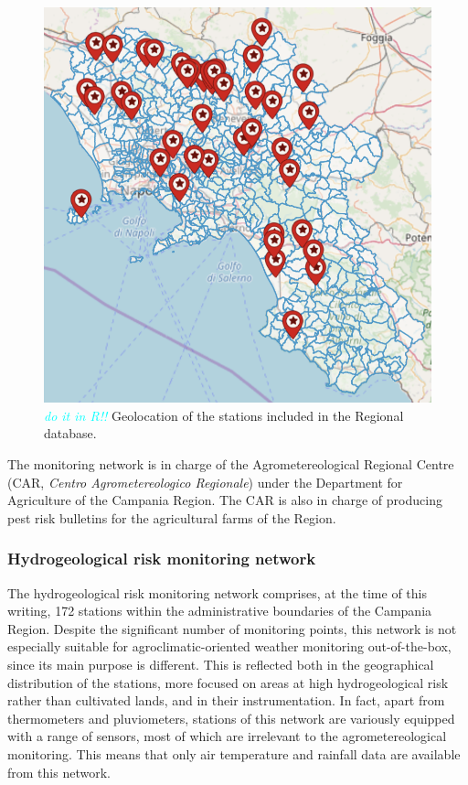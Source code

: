 \documentclass[authoryear,preprint,review,12pt]{elsarticle}
\newcommand{\review}[1]{\emph{\textcolor{cyan}{#1}}}
\begin{document}
\begin{figure}
	\centering
	\includegraphics[scale=.8]{figures/rarLocations}
	\caption{ \review{do it in R!!} Geolocation of the stations included in the Regional database. }
	\label{fig:rarLocations}
\end{figure}

The monitoring network is in charge of the Agrometereological Regional Centre (CAR, \emph{Centro Agrometereologico Regionale}) under the Department for Agriculture of the Campania Region. The CAR is also in charge of producing pest risk bulletins for the agricultural farms of the Region.

\subsubsection{Hydrogeological risk monitoring network\label{DPCNetwork}}
The hydrogeological risk monitoring network comprises, at the time of this writing, 172 stations within the administrative boundaries of the Campania Region.
Despite the significant number of monitoring points, this network is not especially suitable for agroclimatic-oriented weather monitoring out-of-the-box, since its main purpose is different.
This is reflected both in the geographical distribution of the stations, more focused on areas at high hydrogeological risk rather than cultivated lands, and in their instrumentation.
In fact, apart from thermometers and pluviometers, stations of this network are variously equipped with a range of sensors, most of which are irrelevant to the agrometereological monitoring.
This means that only air temperature and rainfall data are available from this network.
\end{document}
